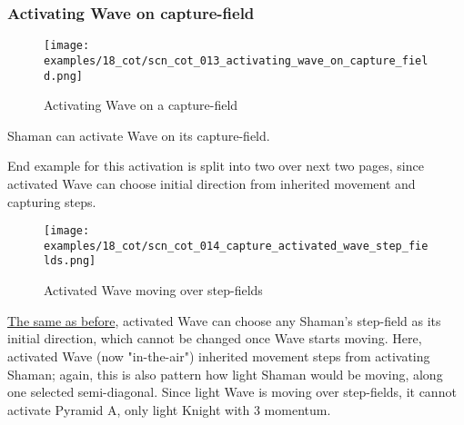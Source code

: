 \subsubsection*{Activating Wave on capture-field}
\label{sec:Conquest of Tlalocan/Shaman/Movement/Activating Wave on capture-field}

\vspace*{-1.4\baselineskip}
\noindent
\begin{figure}[!h]
\texttt{[image: examples/18\_cot/scn\_cot\_013\_activating\_wave\_on\_capture\_field.png]}
\vspace*{-1.4\baselineskip}
\caption{Activating Wave on a capture-field}
\label{fig:scn_cot_013_activating_wave_on_capture_field}
\end{figure}

\vspace*{-0.5\baselineskip}
Shaman can activate Wave on its capture-field.

End example for this activation is split into two over next two pages, since
activated Wave can choose initial direction from inherited movement and capturing
steps.

\clearpage %

\vspace*{-2.3\baselineskip}
\noindent
\begin{figure}[!h]
\texttt{[image: examples/18\_cot/scn\_cot\_014\_capture\_activated\_wave\_step\_fields.png]}
\vspace*{-1.4\baselineskip}
\caption{Activated Wave moving over step-fields}
\label{fig:scn_cot_014_capture_activated_wave_step_fields}
\end{figure}

\vspace*{-0.5\baselineskip}
\hyperref[fig:scn_cot_011_step_activated_wave_step_fields]{The same as before},
activated Wave can choose any Shaman's step-field as its initial direction, which
cannot be changed once Wave starts moving.\newline
\indent
Here, activated Wave (now "in-the-air") inherited movement steps from activating
Shaman; again, this is also pattern how light Shaman would be moving, along one
selected semi-diagonal. Since light Wave is moving over step-fields, it cannot
activate Pyramid A, only light Knight with 3 momentum.

